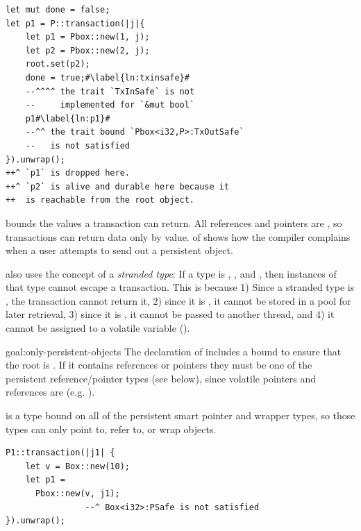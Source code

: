 \begin{discuss}
\begin{lstfloat}
\begin{lstlisting}
let mut done = false;
let p1 = P::transaction(|j|{
    let p1 = Pbox::new(1, j);
    let p2 = Pbox::new(2, j);
    root.set(p2);
    done = true;#\label{ln:txinsafe}#
    --^^^^ the trait `TxInSafe` is not
    --     implemented for `&mut bool`
    p1#\label{ln:p1}#
    --^^ the trait bound `Pbox<i32,P>:TxOutSafe`
    --   is not satisfied
}).unwrap();
++^ `p1` is dropped here.
++^ `p2` is alive and durable here because it
++  is reachable from the root object.
\end{lstlisting}
\caption{Reachability though lifetime and type bounding}
\label{lst:lifetime}
\end{lstfloat}


\end{discuss}

 bounds the values a transaction can return.  All references
and pointers are , so transactions can return data only by
value.  of  shows how the compiler
complains when a user attempts to send out a persistent object.

\This{} also uses the concept of a \emph{stranded type}: If a type is
, , and , then instances of that type
cannot escape a transaction.  This is because 1) Since a stranded type is
, the transaction cannot return it, 2) since it is
, it cannot be stored in a pool for later retrieval, 3) since it is
, it cannot be passed to another thread, and 4) it cannot be assigned 
to a volatile variable ().


\begin{goaltrue}{goal:only-persistent-objects}
  The declaration of  includes a bound to ensure that the root is
  .  If it contains references or pointers they must be one of
  the persistent reference/pointer types (see below), since volatile pointers
  and references are  (e.g. ).
  
   is a type bound on all of the persistent smart pointer and wrapper
  types, so those types can only point to, refer to, or wrap 
  objects.

\begin{lstfloat}
\begin{lstlisting}
P1::transaction(|j1| {
    let v = Box::new(10);
    let p1 =
      Pbox::new(v, j1);
                --^ Box<i32>:PSafe is not satisfied
}).unwrap();
\end{lstlisting}
\caption{Only persistent-safe objects are acceptable.}
\label{lst:psafe}
\end{lstfloat}
\end{goaltrue}

